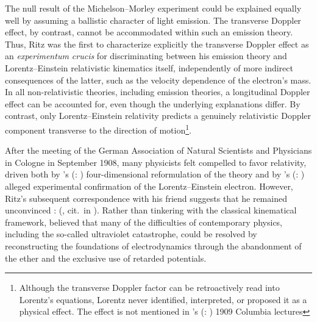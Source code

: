 \documentclass[pdflatex]{sn-jnl}
\newcommand{\tDe}{transverse Doppler effect\xspace}
\newcommand{\tm}{; translation modified}
\renewcommand{\citets}[2][]{\citeauthor{#2}'s (\citeyear{#2}\if\relax\detokenize{#1}\relax\else: #1\fi)}
\begin{document}
%
The null result of the Michelson--Morley experiment could be explained equally well by assuming a ballistic character of light emission. The \tDe, by contrast, cannot be accommodated within such an emission theory. Thus, Ritz was the first to characterize explicitly the transverse Doppler effect as an \textit{experimentum crucis} for discriminating between his emission theory and Lorentz--Einstein relativistic kinematics itself, independently of more indirect consequences of the latter, such as the velocity dependence of the electron’s mass. In all non-relativistic theories, including emission theories, a longitudinal Doppler effect can be accounted for, even though the underlying explanations differ. By contrast, only Lorentz--Einstein relativity predicts a genuinely relativistic Doppler component transverse to the direction of motion\footnote{Although the transverse Doppler factor can be retroactively read into Lorentz’s equations, Lorentz never identified, interpreted, or proposed it as a physical effect. The effect is not mentioned in \citets{Lorentz1916} 1909 Columbia lectures}.

After the meeting of the German Association of Natural Scientists and Physicians in Cologne in September 1908, many physicists felt compelled to favor relativity, driven both by \citets{Minkowski1909} four-dimensional reformulation of the theory and by \citets{Bucherer1908} alleged experimental confirmation of the Lorentz--Einstein electron. However, Ritz’s subsequent correspondence with his friend \Ehr suggests that he remained unconvinced \citep[268--271]{Staley2008}:  (, cit.\ in \citealp[270f.\tm]{Staley2008}). Rather than tinkering with the classical kinematical framework, \citet{Ritz1908} believed that many of the difficulties of contemporary physics, including the so-called ultraviolet catastrophe, could be resolved by reconstructing the foundations of electrodynamics through the abandonment of the ether and the exclusive use of retarded potentials.
\end{document}
